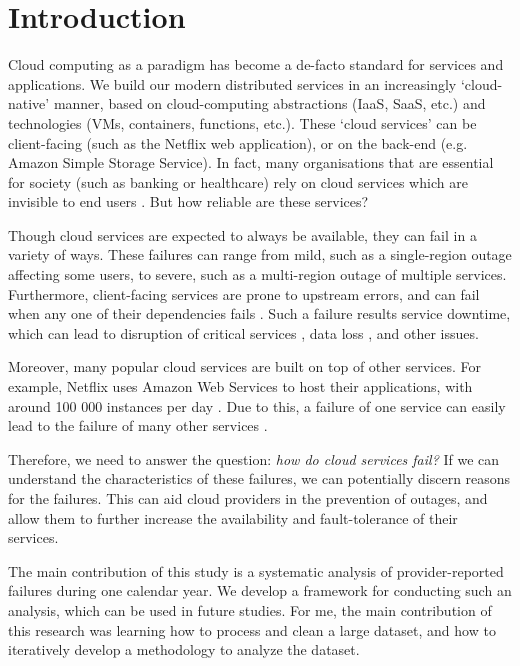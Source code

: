 \section{Introduction}
Cloud computing as a paradigm has become a de-facto standard for services and applications.
We build our modern distributed services in an increasingly `cloud-native' manner, based on cloud-computing abstractions (IaaS, SaaS, etc.) and technologies (VMs, containers, functions, etc.).
These `cloud services' can be client-facing (such as the Netflix web application), or on the back-end (e.g. Amazon Simple Storage Service).
In fact, many organisations that are essential for society (such as banking or healthcare) rely on cloud services which are invisible to end users \cite{armbrust2010,dean2015}.
But how reliable are these services?

Though cloud services are expected to always be available, they can fail in a variety of ways.
These failures can range from mild, such as a single-region outage affecting some users, to severe, such as a multi-region outage of multiple services.
Furthermore, client-facing services are prone to upstream errors, and can fail when any one of their dependencies fails \cite{steen2016}.
Such a failure results service downtime, which can lead to disruption of critical services \cite{emergencyOnCloud,healthcareCrash}, data loss \cite{tencentDataLoss}, and other issues.

Moreover, many popular cloud services are built on top of other services.
For example, Netflix uses Amazon Web Services to host their applications, with around 100 000 instances per day \cite{awsNetflixStudy}.
Due to this, a failure of one service can easily lead to the failure of many other services \cite{whittaker2013,azureXboxOutage2013,azureXboxOutage2014}.

Therefore, we need to answer the question: \textit{how do cloud services fail?}
If we can understand the characteristics of these failures, we can potentially discern reasons for the failures.
This can aid cloud providers in the prevention of outages, and allow them to further increase the availability and fault-tolerance of their services.

The main contribution of this study is a systematic analysis of provider-reported failures during one calendar year.
We develop a framework for conducting such an analysis, which can be used in future studies.
For me, the main contribution of this research was learning how to process and clean a large dataset, and how to iteratively develop a methodology to analyze the dataset.
